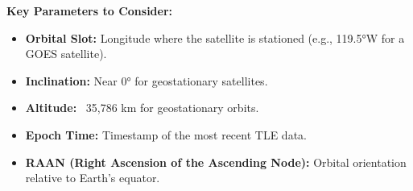 \textbf{Key Parameters to Consider:}
\begin{itemize}
    \item \textbf{Orbital Slot:} Longitude where the satellite is stationed (e.g., 119.5°W for a GOES satellite).
    \item \textbf{Inclination:} Near 0° for geostationary satellites.
    \item \textbf{Altitude:} ~35,786 km for geostationary orbits.
    \item \textbf{Epoch Time:} Timestamp of the most recent TLE data.
    \item \textbf{RAAN (Right Ascension of the Ascending Node):} Orbital orientation relative to Earth's equator.
\end{itemize}


\endinput  %
\section{Introduction}
Understanding and tracking geosynchronous satellites requires precise data about their time, space, and positional parameters. This document provides various resources and methods to acquire such information.

\section{Sources for Satellite Data}

\subsection{Two-Line Element Sets (TLE Data)}
Two-Line Element Sets (TLEs) provide standard satellite position data.

\begin{itemize}
    \item \textbf{CelesTrak}: \url{https://celestrak.com/}
    \begin{itemize}
        \item Offers categorized TLEs for geosynchronous satellites, including communication, navigation, and weather.
    \end{itemize}
    \item \textbf{NORAD via Space-Track.org}: \url{https://www.space-track.org/}
    \begin{itemize}
        \item Provides authoritative TLEs with registration required.
    \end{itemize}
\end{itemize}

